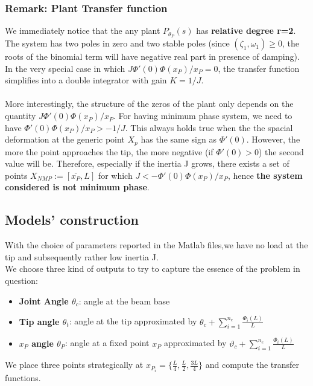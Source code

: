 \documentclass[a4paper, 12pt]{article}
\begin{document}
\subsubsection*{Remark: Plant Transfer function}
We immediately notice that the any plant $P_{\theta_P}(s)$   has \textbf{relative degree r=2}. \\The system has two poles in zero and two stable poles (since $(\zeta_1, \omega_1) \geq 0$, the roots of the binomial term will have negative real part in presence of damping).\\
In the very special case in which $J\Phi'(0)\Phi(x_P)/x_P = 0$, the transfer function simplifies into a double integrator with gain $K = 1/J$.
\\\\More interestingly, the structure of the zeros of the plant only depends on the quantity $J\Phi'(0)\Phi(x_P)/x_P$. For having minimum phase system, we need to have $\Phi'(0)\Phi(x_P)/x_P > -1/J$. This always holds true when the the spacial deformation at the generic point $X_p$ has the same sign as $\Phi'(0)$. However, the more the point approaches the tip, the more negative (if $\Phi'(0) > 0$) the second value will be. Therefore, especially if the inertia J grows, there exists a set of points $X_{NMP} := [\overline{x_P}, L]$ for which $J < -\Phi'(0)\Phi(x_P)/x_P$, hence \textbf{the system considered is not minimum phase}.


\subsection{Models' construction}
With the choice of parameters reported in the Matlab files,we have no load at the tip and subsequently rather low inertia J.\\
We choose three kind of outputs to try to capture the essence of the problem in question:\\
\begin{itemize}
\item\textbf{Joint Angle $\theta_c$}: angle at the beam base
\item\textbf{Tip angle $\theta_t$}: angle at the tip approximated by $\theta_c + \sum_{i=1}^{n_e}\frac{\Phi_i(L)}{L}$
\item\textbf{$x_P$ angle $\theta_P$}: angle at a fixed point $x_P$ approximated by $\vartheta_c + \sum_{i=1}^{n_e}\frac{\Phi_i(L)}{L}$
\label{sec:Modelconstruction}
\end{itemize}
We place three points strategically at $x_{P_i} = \{\frac{L}{4},\frac{L}{2},\frac{3L}{4}\}$ and compute the transfer functions.
\end{document}
